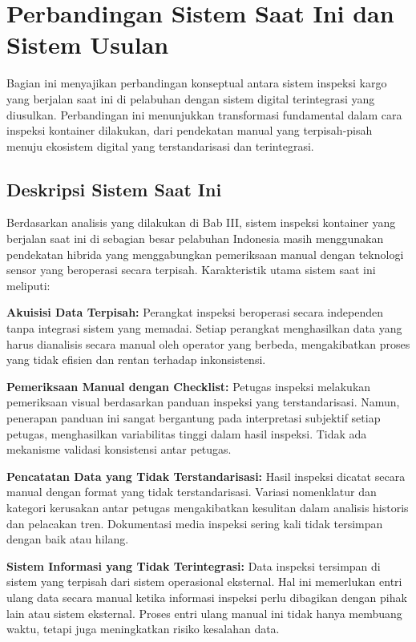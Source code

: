 \section{Perbandingan Sistem Saat Ini dan Sistem Usulan}
\label{sec:perbandingan-sistem}

Bagian ini menyajikan perbandingan konseptual antara sistem inspeksi kargo yang berjalan saat ini di pelabuhan dengan sistem digital terintegrasi yang diusulkan. Perbandingan ini menunjukkan transformasi fundamental dalam cara inspeksi kontainer dilakukan, dari pendekatan manual yang terpisah-pisah menuju ekosistem digital yang terstandarisasi dan terintegrasi.

\subsection{Deskripsi Sistem Saat Ini}
\label{subsec:deskripsi-sistem-saat-ini}

Berdasarkan analisis yang dilakukan di Bab III, sistem inspeksi kontainer yang berjalan saat ini di sebagian besar pelabuhan Indonesia masih menggunakan pendekatan hibrida yang menggabungkan pemeriksaan manual dengan teknologi sensor yang beroperasi secara terpisah. Karakteristik utama sistem saat ini meliputi:

\textbf{Akuisisi Data Terpisah:}
Perangkat inspeksi beroperasi secara independen tanpa integrasi sistem yang memadai. Setiap perangkat menghasilkan data yang harus dianalisis secara manual oleh operator yang berbeda, mengakibatkan proses yang tidak efisien dan rentan terhadap inkonsistensi.

\textbf{Pemeriksaan Manual dengan Checklist:}
Petugas inspeksi melakukan pemeriksaan visual berdasarkan panduan inspeksi yang terstandarisasi. Namun, penerapan panduan ini sangat bergantung pada interpretasi subjektif setiap petugas, menghasilkan variabilitas tinggi dalam hasil inspeksi. Tidak ada mekanisme validasi konsistensi antar petugas.

\textbf{Pencatatan Data yang Tidak Terstandarisasi:}
Hasil inspeksi dicatat secara manual dengan format yang tidak terstandarisasi. Variasi nomenklatur dan kategori kerusakan antar petugas mengakibatkan kesulitan dalam analisis historis dan pelacakan tren. Dokumentasi media inspeksi sering kali tidak tersimpan dengan baik atau hilang.

\textbf{Sistem Informasi yang Tidak Terintegrasi:}
Data inspeksi tersimpan di sistem yang terpisah dari sistem operasional eksternal. Hal ini memerlukan entri ulang data secara manual ketika informasi inspeksi perlu dibagikan dengan pihak lain atau sistem eksternal. Proses entri ulang manual ini tidak hanya membuang waktu, tetapi juga meningkatkan risiko kesalahan data.

